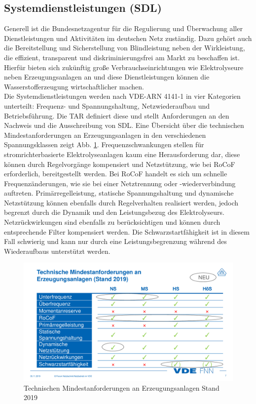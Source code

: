 	\subsection{Systemdienstleistungen (SDL)}
	Generell ist die Bundesnetzagentur für die Regulierung und Überwachung aller Dienstleistungen und Aktivitäten im deutschen Netz zuständig. Dazu gehört auch die Bereitstellung und Sicherstellung von Blindleistung neben der Wirkleistung, die effizient, transparent und diskriminierungsfrei am Markt zu beschaffen ist. Hierfür bieten sich zukünftig große Verbrauchseinrichtungen wie Elektrolyseure neben Erzeugungsanlagen an und diese Dienstleistungen können die Wasserstofferzeugung wirtschaftlicher machen.\\
	Die Systemdienstleistungen werden nach VDE-ARN 4141-1 in vier Kategorien unterteilt: Frequenz- und Spannungshaltung, Netzwiederaufbau und Betriebsführung. Die \gls{TAR} definiert diese und stellt Anforderungen an den Nachweis und die Ausschreibung von \gls{SDL}. Eine Übersicht über die technischen Mindestanforderungen an Erzeugungsanlagen in den verschiedenen Spannungsklassen zeigt Abb. \ref{fig:vde-fnn-tar}. Frequenzschwankungen stellen für stromrichterbasierte Elektrolyseanlagen kaum eine Herausforderung dar, diese können durch Regelvorgänge kompensiert und Netzstützung, wie bei \gls{RoCoF} erforderlich, bereitgestellt werden. Bei \gls{RoCoF} handelt es sich um schnelle Frequenzänderungen, wie sie bei einer Netztrennung oder -wiederverbindung auftreten. Primärregelleistung, statische Spannungshaltung und dynamische Netzstützung können ebenfalls durch Regelverhalten realisiert werden, jedoch begrenzt durch die Dynamik und den Leistungsbezug des Elektrolyseurs. Netzrückwirkungen sind ebenfalls zu berücksichtigen und können durch entsprechende Filter kompensiert werden. Die Schwarzstartfähigkeit ist in diesem Fall schwierig und kann nur durch eine Leistungsbegrenzung während des Wiederaufbaus unterstützt werden.
	\begin{figure}
		\centering
		\includegraphics[width=0.9\linewidth]{content/Grafiken/VDE-FNN-TAR}
		\caption[Technischen Mindestanforderungen an Erzeugungsanlagen Stand 2019]{Technischen Mindestanforderungen an Erzeugungsanlagen Stand 2019 \cite{VDEFNN2019SDL}}
		\label{fig:vde-fnn-tar}
	\end{figure}
	
